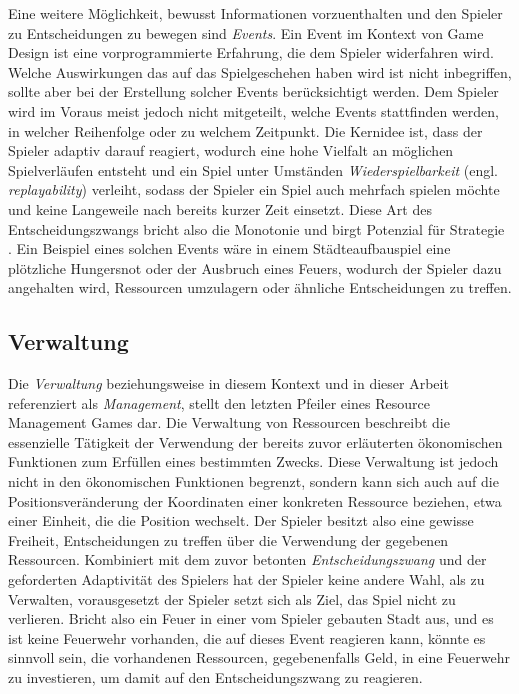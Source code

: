 Eine weitere Möglichkeit, bewusst Informationen vorzuenthalten und den Spieler zu Entscheidungen zu bewegen sind \textit{Events}. Ein Event im Kontext von Game Design ist eine vorprogrammierte Erfahrung, die dem Spieler widerfahren wird. Welche Auswirkungen das auf das Spielgeschehen haben wird ist nicht inbegriffen, sollte aber bei der Erstellung solcher Events berücksichtigt werden. Dem Spieler wird im Voraus meist jedoch nicht mitgeteilt, welche Events stattfinden werden, in welcher Reihenfolge oder zu welchem Zeitpunkt. Die Kernidee ist, dass der Spieler adaptiv darauf reagiert, wodurch eine hohe Vielfalt an möglichen Spielverläufen entsteht und ein Spiel unter Umständen \textit{Wiederspielbarkeit} (engl. \textit{replayability}) verleiht, sodass der Spieler ein Spiel auch mehrfach spielen möchte und keine Langeweile nach bereits kurzer Zeit einsetzt. Diese Art des Entscheidungszwangs bricht also die Monotonie und birgt Potenzial für Strategie \cite*[]{article:events}. Ein Beispiel eines solchen Events wäre in einem Städteaufbauspiel eine plötzliche Hungersnot oder der Ausbruch eines Feuers, wodurch der Spieler dazu angehalten wird, Ressourcen umzulagern oder ähnliche Entscheidungen zu treffen.

\subsection{Verwaltung}
Die \textit{Verwaltung} beziehungsweise in diesem Kontext und in dieser Arbeit referenziert als \textit{Management}, stellt den letzten Pfeiler eines Resource Management Games dar. Die Verwaltung von Ressourcen beschreibt die essenzielle Tätigkeit der Verwendung der bereits zuvor erläuterten ökonomischen Funktionen zum Erfüllen eines bestimmten Zwecks. Diese Verwaltung ist jedoch nicht in den ökonomischen Funktionen begrenzt, sondern kann sich auch auf die Positionsveränderung der Koordinaten einer konkreten Ressource beziehen, etwa einer Einheit, die die Position wechselt. Der Spieler besitzt also eine gewisse Freiheit, Entscheidungen zu treffen über die Verwendung der gegebenen Ressourcen. Kombiniert mit dem zuvor betonten \textit{Entscheidungszwang} und der geforderten Adaptivität des Spielers hat der Spieler keine andere Wahl, als zu Verwalten, vorausgesetzt der Spieler setzt sich als Ziel, das Spiel nicht zu verlieren. 
Bricht also ein Feuer in einer vom Spieler gebauten Stadt aus, und es ist keine Feuerwehr vorhanden, die auf dieses Event reagieren kann, könnte es sinnvoll sein, die vorhandenen Ressourcen, gegebenenfalls Geld, in eine Feuerwehr zu investieren, um damit auf den Entscheidungszwang zu reagieren.